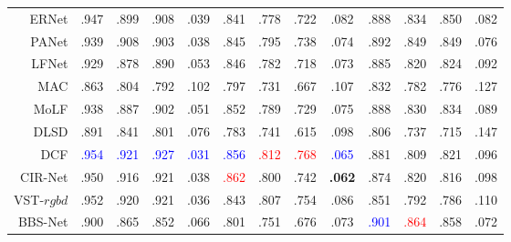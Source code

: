 \begin{table}[!ht]
{\begin{tabular}{rcccccccccccc}
			ERNet \upcite{piao2020exploit}
			& .947 & .899 & .908 & .039 
			&	.841 &	.778 &	.722 &	.082 
			&	.888 &	.834 &	.850 &	.082 
			\\
			
			PANet \upcite{piao2021panet} 
			& .939 & .908 & .903 & .038 
			& .845 & .795 & .738 & .074 
			& .892 & .849 & .849 & .076
			\\
			
			LFNet	 \upcite{zhang2020lfnet} 
			& .929 & .878 & .890 & .053
			&	.846 &	.782 &	.718 &	.073 
			&	.885 &	.820 &	.824 &	.092 \\
			
			MAC	 \upcite{zhang2020light} 
			& .863	& .804	& .792	& .102	
			&   .797 & .731 & .667 & .107 
			& .832 & .782 & .776 & .127 \\
			
			MoLF	 \upcite{zhang2019memory} 
			& .938 & .887 & .902 & .051 
			&	.852 &	.789 &	.729 &	.075 
			&	.888 &	.830 &	.834 &	.089 \\
			
			DLSD	\upcite{piao2019deep}
			& .891	& .841	& .801	& .076	
			&   .783 & .741 & .615 & .098 
			& .806 & .737 & .715 & .147 \\
			
			\midrule[1pt] %
			
			
			DCF \upcite{ji2021calibrated} 
			& \textcolor{blue}{.954} & \textcolor{blue}{.921} & \textcolor{blue}{.927} & \textcolor{blue}{.031} 
			& \textcolor{blue}{.856} & {\textcolor{red}{.812}} & {\textcolor{red}{.768}} & \textcolor{blue}{.065} 
			& .881 & .809 & .821 & .096 \\
			
			CIR-Net \upcite{cong2022cir}
			& .950 & .916 & .921 & .038 
			& {\textcolor{red}{.862}} & .800  			& .742 & \textbf{ {.062}} 
			& .874 & .820 & .816 & .098 \\ 
			
			VST-$rgbd$  \upcite{liu2021visual} 
			& .952 & .920 & .921 & .036 
			& .843 & .807 & .754 & .086 
			& .851 & .792 & .786 & .110 
			\\
			
			
			BBS-Net     \upcite{fan2020bbs} 
			& .900 & .865 & .852 & .066 
			& .801 & .751 & .676 & .073 
			& \textcolor{blue}{.901} & {\textcolor{red}{.864}} & .858 & .072 \\ 
			

\end{tabular}}
\end{table}

